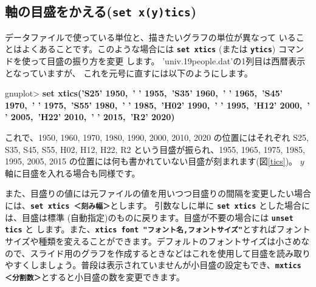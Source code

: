 \documentclass[a4j]{ujarticle} %
\newenvironment{terminal}{%
  \begin{center}
   \begin{minipage}{.8\textwidth}
    \setlength{\FrameSep}{.5\FrameSep}%
    \begin{framed}\ttfamily\small%
     \setlength\baselineskip{.85\baselineskip}%
}{%
    \end{framed}
   \end{minipage}
  \end{center}%
}
\begin{document}
\subsection{軸の目盛をかえる({\tt\bf set x(y)tics})}\label{ticsec}
データファイルで使っている単位と、描きたいグラフの単位が異なって
いることはよくあることです。このような場合には {\tt\bf set
xtics} (または {\tt\bf ytics}) コマンドを使って目盛の振り方を変更
します。
'univ.19people.dat'の1列目は西暦表示となっていますが、 これを元号に直すには以下のようにします。
\begin{terminal}
gnuplot> {\bf set xtics('S25' 1950,\ ' ' 1955,\  'S35' 1960,\ ' ' 1965,\ 'S45' 1970,\ ' ' 1975,\ 'S55' 1980,\ ' ' 1985,\  'H02' 1990,\ ' ' 1995,\ 'H12' 2000,\ ' ' 2005,\  'H22' 2010,\ ' ' 2015,\ 'R2' 2020)}
\end{terminal}
これで、1950, 1960, 1970, 1980, 1990, 2000, 2010, 2020 の位置にはそれぞれ S25, S35, S45, S55, H02, H12, H22, R2 という目盛が振られ、1955, 1965, 1975, 1985, 1995, 2005, 2015 の位置には何も書かれていない目盛が刻まれます(図\ref{tics})。
$y$ 軸に目盛を入れる場合も同様です。

また、目盛りの値には元ファイルの値を用いつつ目盛りの間隔を変更したい場合には、{\tt\bf set xtics ＜刻み幅＞}とします。 引数なしに単に {\tt\bf set xtics} とした場合には、目盛は標準 (自動指定)のものに戻ります。目盛が不要の場合には {\tt\bf unset tics} と します。また、{\tt\bf xtics font "フォント名,フォントサイズ"}とすればフォントサイズや種類を変えることができます。デフォルトのフォントサイズは小さめなので、スライド用のグラフを作成するときなどはこれを使用して目盛を読み取りやすくしましょう。普段は表示されていませんが小目盛の設定もでき、{\tt\bf mxtics ＜分割数＞}とすると小目盛の数を変更できます。
\end{document}
